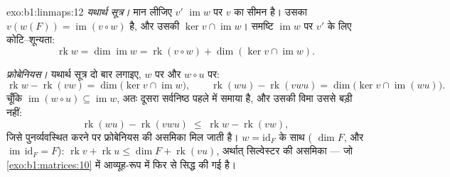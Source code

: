 \begin{solution}{exo:b1:linmaps:12}
\emph{यथार्थ सूत्र।} मान लीजिए $v'$  $\operatorname{im} w$ पर $v$ का
सीमन है। उसका  $v(w(F)) = \operatorname{im}(v \circ w)$ है, और उसकी
 $\ker v \cap \operatorname{im} w$। समष्टि $\operatorname{im} w$ पर
$v'$ के लिए कोटि--शून्यता:
\[
\operatorname{rk} w = \dim\operatorname{im} w
= \operatorname{rk}(v \circ w) + \dim(\ker v \cap
\operatorname{im} w) .
\]

\emph{फ्रोबेनियस।} यथार्थ सूत्र दो बार लगाइए, $w$ पर और $w \circ u$ पर:
\[
\operatorname{rk} w - \operatorname{rk}(vw)
= \dim\bigl(\ker v \cap \operatorname{im} w\bigr),
\qquad
\operatorname{rk}(wu) - \operatorname{rk}(vwu)
= \dim\bigl(\ker v \cap \operatorname{im}(wu)\bigr) .
\]
चूँकि $\operatorname{im}(w \circ u) \subseteq \operatorname{im} w$, अतः
दूसरा सर्वनिष्ठ पहले में समाया है, और उसकी विमा उससे बड़ी नहीं:
\[
\operatorname{rk}(wu) - \operatorname{rk}(vwu)
\;\leq\; \operatorname{rk} w - \operatorname{rk}(vw) ,
\]
जिसे पुनर्व्यवस्थित करने पर फ्रोबेनियस की असमिका मिल जाती है। $w =
\mathrm{id}_F$ के साथ ( $\dim F$, और $\operatorname{im}\, \mathrm{id}_F
= F$): $\operatorname{rk} v + \operatorname{rk} u \leq \dim F +
\operatorname{rk}(vu)$, अर्थात् सिल्वेस्टर की असमिका --- जो
\cref{exo:b1:matrices:10} में आव्यूह-रूप में फिर से सिद्ध की गई है।
\end{solution}

